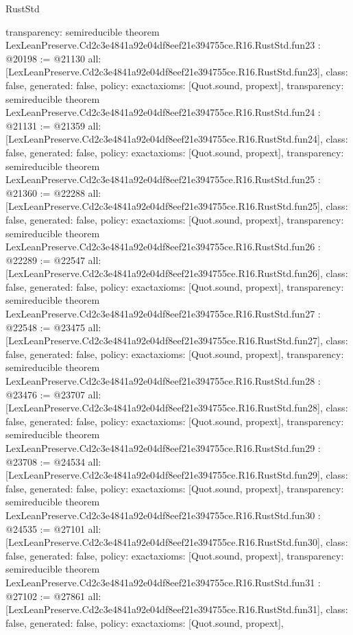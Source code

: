 \begin{lexlean}{RustStd}
\begin{coremodule}
{  transparency: semireducible
}
theorem LexLeanPreserve.Cd2c3e4841a92e04df8eef21e394755ce.R16.RustStd.fun23 : @20198 := @21130 {
  all: [LexLeanPreserve.Cd2c3e4841a92e04df8eef21e394755ce.R16.RustStd.fun23],
  class: false,
  generated: false,
  policy: exact{axioms: [Quot.sound, propext]},
  transparency: semireducible
}
theorem LexLeanPreserve.Cd2c3e4841a92e04df8eef21e394755ce.R16.RustStd.fun24 : @21131 := @21359 {
  all: [LexLeanPreserve.Cd2c3e4841a92e04df8eef21e394755ce.R16.RustStd.fun24],
  class: false,
  generated: false,
  policy: exact{axioms: [Quot.sound, propext]},
  transparency: semireducible
}
theorem LexLeanPreserve.Cd2c3e4841a92e04df8eef21e394755ce.R16.RustStd.fun25 : @21360 := @22288 {
  all: [LexLeanPreserve.Cd2c3e4841a92e04df8eef21e394755ce.R16.RustStd.fun25],
  class: false,
  generated: false,
  policy: exact{axioms: [Quot.sound, propext]},
  transparency: semireducible
}
theorem LexLeanPreserve.Cd2c3e4841a92e04df8eef21e394755ce.R16.RustStd.fun26 : @22289 := @22547 {
  all: [LexLeanPreserve.Cd2c3e4841a92e04df8eef21e394755ce.R16.RustStd.fun26],
  class: false,
  generated: false,
  policy: exact{axioms: [Quot.sound, propext]},
  transparency: semireducible
}
theorem LexLeanPreserve.Cd2c3e4841a92e04df8eef21e394755ce.R16.RustStd.fun27 : @22548 := @23475 {
  all: [LexLeanPreserve.Cd2c3e4841a92e04df8eef21e394755ce.R16.RustStd.fun27],
  class: false,
  generated: false,
  policy: exact{axioms: [Quot.sound, propext]},
  transparency: semireducible
}
theorem LexLeanPreserve.Cd2c3e4841a92e04df8eef21e394755ce.R16.RustStd.fun28 : @23476 := @23707 {
  all: [LexLeanPreserve.Cd2c3e4841a92e04df8eef21e394755ce.R16.RustStd.fun28],
  class: false,
  generated: false,
  policy: exact{axioms: [Quot.sound, propext]},
  transparency: semireducible
}
theorem LexLeanPreserve.Cd2c3e4841a92e04df8eef21e394755ce.R16.RustStd.fun29 : @23708 := @24534 {
  all: [LexLeanPreserve.Cd2c3e4841a92e04df8eef21e394755ce.R16.RustStd.fun29],
  class: false,
  generated: false,
  policy: exact{axioms: [Quot.sound, propext]},
  transparency: semireducible
}
theorem LexLeanPreserve.Cd2c3e4841a92e04df8eef21e394755ce.R16.RustStd.fun30 : @24535 := @27101 {
  all: [LexLeanPreserve.Cd2c3e4841a92e04df8eef21e394755ce.R16.RustStd.fun30],
  class: false,
  generated: false,
  policy: exact{axioms: [Quot.sound, propext]},
  transparency: semireducible
}
theorem LexLeanPreserve.Cd2c3e4841a92e04df8eef21e394755ce.R16.RustStd.fun31 : @27102 := @27861 {
  all: [LexLeanPreserve.Cd2c3e4841a92e04df8eef21e394755ce.R16.RustStd.fun31],
  class: false,
  generated: false,
  policy: exact{axioms: [Quot.sound, propext]},
}
\end{coremodule}
\end{lexlean}
